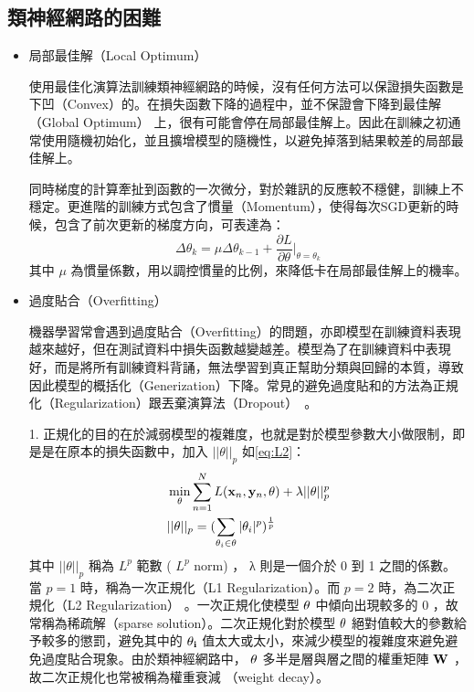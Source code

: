 \subsection{類神經網路的困難}
\begin{itemize}
\item{局部最佳解（Local Optimum）}

	使用最佳化演算法訓練類神經網路的時候，沒有任何方法可以保證損失函數是下凹（Convex）的。在損失函數下降的過程中，並不保證會下降到最佳解（Global Optimum） 上，很有可能會停在局部最佳解上。因此在訓練之初通常使用隨機初始化，並且擴增模型的隨機性，以避免掉落到結果較差的局部最佳解上。

同時梯度的計算牽扯到函數的一次微分，對於雜訊的反應較不穩健，訓練上不穩定。更進階的訓練方式包含了慣量（Momentum），使得每次SGD更新的時候，包含了前次更新的梯度方向，可表達為：
\begin{equation}
\Delta \theta_{k} =  \mu \Delta \theta_{k-1} + \frac{\partial L}{\partial \theta} \biggr|_{\theta = \theta_k}
\end{equation}
其中 $ \mu $ 為慣量係數，用以調控慣量的比例，來降低卡在局部最佳解上的機率。
\item{ 過度貼合（Overfitting）}
	
	機器學習常會遇到過度貼合（Overfitting）的問題，亦即模型在訓練資料表現越來越好，但在測試資料中損失函數越變越差。模型為了在訓練資料中表現好，而是將所有訓練資料背誦，無法學習到真正幫助分類與回歸的本質，導致因此模型的概括化（Generization）下降。常見的避免過度貼和的方法為正規化（Regularization）跟丟棄演算法（Dropout）~\cite{srivastava2014dropout}。

	1. 正規化的目的在於減弱模型的複雜度，也就是對於模型參數大小做限制，即是是在原本的損失函數中，加入 $ ||\theta||_p $ 如\ref{eq:L2}：
\begin{equation}
\label{eq:L2}
\begin{aligned}
&\min_{\theta}{ \sum_{n=1}^{N}{ {L( \bold{x}_n ,\bold{y}_n,\theta)}}+\lambda||\theta||_p^p}
\\
&||\theta||_p = ( \sum_{\theta_i \in \bold{\theta}}{|\theta_i|^p} )^\frac{1}{p}
\end{aligned}
\end{equation}
其中 $ ||\theta||_p $  稱為  $ L^p $  範數 (  $ L^ p $   norm) ， λ 則是一個介於 0 到 1 之間的係數。
當  $ p = 1 $  時，稱為一次正規化（L1 Regularization）。而  $ p =
2 $ 時，為二次正規化（L2 Regularization）
。一次正規化使模型 $ \bold{\theta} $ 
中傾向出現較多的 $ 0 $ ，故常稱為稀疏解（sparse solution）。二次正規化對於模型
 $ \bold{\theta} $ 
絕對值較大的參數給予較多的懲罰，避免其中的 $ \bold{\theta_i} $ 值太大或太小，來減少模型的複雜度來避免避免過度貼合現象。由於類神經網路中， $ \bold{\theta} $ 
多半是層與層之間的權重矩陣 $ \bold{W} $  ，故二次正規化也常被稱為權重衰減 （weight
decay）。


\end{itemize}
